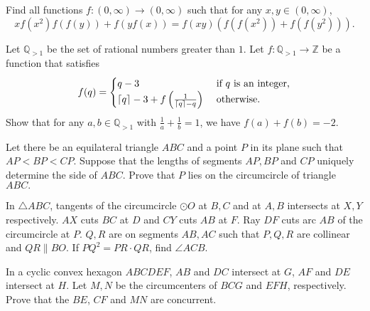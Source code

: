 \documentclass[11pt]{scrartcl}
\begin{document}
\begin{problem}[173010886819234]
	Find all functions $f:(0,\infty)\rightarrow (0,\infty)$ such that for any $x,y\in (0,\infty)$,$$xf(x^2)f(f(y)) + f(yf(x)) = f(xy) \left(f(f(x^2)) + f(f(y^2))\right).$$
\end{problem}
\begin{problem}[521941955566221852]
Let $\mathbb{Q}_{>1}$ be the set of rational numbers greater than $1$. Let $f:\mathbb{Q}_{>1}\to \mathbb{Z}$ be a function that satisfies
\[f(q)=\begin{cases}
q-3&\textup{ if }q\textup{ is an integer,}\\
\lceil q\rceil-3+f\left(\frac{1}{\lceil q\rceil-q}\right)&\textup{ otherwise.}
\end{cases}\]Show that for any $a,b\in\mathbb{Q}_{>1}$ with $\frac{1}{a}+\frac{1}{b}=1$, we have $f(a)+f(b)=-2$.
\end{problem}
\begin{problem}[8982900673855870942]
Let there be an equilateral triangle $ABC$ and a point $P$ in its plane such that $AP<BP<CP.$ Suppose that the lengths of segments $AP,BP$ and $CP$ uniquely determine the side of $ABC$. Prove that $P$ lies on the circumcircle of triangle $ABC.$
\end{problem}
\begin{problem}[162618813015033]
In $\triangle {ABC}$, tangents of the circumcircle $\odot {O}$ at $B, C$ and at $A, B$ intersects at $X, Y$ respectively. $AX$ cuts $BC$ at ${D}$ and $CY$ cuts $AB$ at ${F}$. Ray $DF$ cuts arc $AB$ of the circumcircle at ${P}$. $Q, R$ are on segments $AB, AC$ such that $P, Q, R$ are collinear and $QR \parallel BO$. If $PQ^2=PR \cdot QR$, find $\angle ACB$.
\end{problem}
\begin{problem}[409530198849693]
In a cyclic convex hexagon $ABCDEF$, $AB$ and $DC$ intersect at $G$, $AF$ and $DE$ intersect at $H$. Let $M, N$ be the circumcenters of $BCG$ and $EFH$, respectively. Prove that the $BE$, $CF$ and $MN$ are concurrent.
\end{problem}
\end{document}
